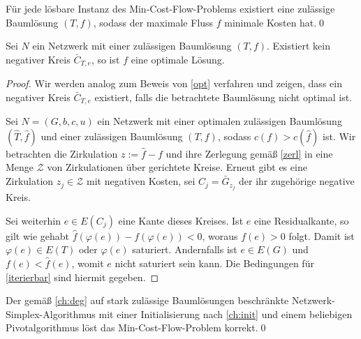 \begin{kor}Für jede lösbare Instanz des Min-Cost-Flow-Problems existiert eine zulässige Baumlösung $(T,f)$, sodass der maximale Fluss $f$ minimale Kosten hat.\qed\end{kor}

\begin{thm}\label{opt2}Sei $N$ ein Netzwerk mit einer zulässigen Baumlösung $(T,f)$. Existiert kein negativer Kreis $\bar{C}_{T,e}$, so ist $f$ eine optimale Lösung.\end{thm}
\begin{proof}Wir werden analog zum Beweis von \cref{opt} verfahren und zeigen, dass ein negativer Kreis $\bar{C}_{T,e}$ existiert, falls die betrachtete Baumlösung nicht optimal ist.

Sei $N=(G,b,c,u)$ ein Netzwerk mit einer optimalen zulässigen Baumlösung $(\hat{T},\hat{f})$ und einer zulässigen Baumlösung $(T,f)$, sodass $c(f)>c(\hat{f})$ ist. Wir betrachten die Zirkulation $z:=\hat{f}-f$ und ihre Zerlegung gemäß \cref{zerl} in eine Menge $\mathscr{Z}$ von Zirkulationen über gerichtete Kreise. Erneut gibt es eine Zirkulation $z_j\in\mathscr{Z}$ mit negativen Kosten, sei $C_j=\bar{G}_{z_j}$ der ihr zugehörige negative Kreis.

Sei weiterhin $e\in E(C_j)$ eine Kante dieses Kreises. Ist $e$ eine Residualkante, so gilt wie gehabt $\hat{f}(\varphi(e))-f(\varphi(e))<0$, woraus $f(e)>0$ folgt. Damit ist $\varphi(e)\in E(T)$ oder $\varphi(e)$ saturiert. Andernfalls ist $e\in E(G)$ und $f(e)<\hat{f}(e)$, womit $e$ nicht saturiert sein kann. Die Bedingungen für \cref{iterierbar} sind hiermit gegeben.\end{proof}

\begin{kor}Der gemäß \cref{ch:deg} auf stark zulässige Baumlösungen beschränkte Netzwerk-Simplex-Algorithmus mit einer Initialisierung nach \cref{ch:init} und einem beliebigen Pivotalgorithmus löst das Min-Cost-Flow-Problem korrekt.\qed\end{kor}
